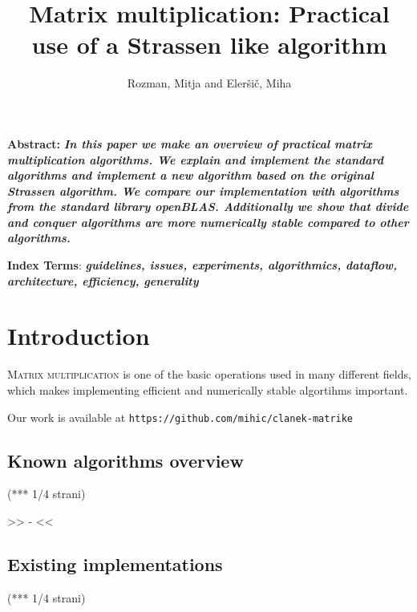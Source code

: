 \documentclass[a4paper,11pt]{article}
\title{Matrix multiplication: Practical use of a Strassen like algorithm}
\author{Rozman, Mitja and Eleršič, Miha}
\date{}
\renewenvironment{abstract}
{\begin{spacing}{1}\small\textbf{Abstract:}\bfseries\itshape}
{\end{spacing}}
\begin{document}
\maketitle



\begingroup
\renewcommand\thefootnote{}
\endgroup

\begin{abstract} %
In this paper we make an overview of practical matrix multiplication algorithms.
We explain and implement the standard algorithms and implement a new algorithm based on the original Strassen algorithm.
We compare our implementation with algorithms from the standard library openBLAS. Additionally we show that divide and conquer algorithms are more numerically stable compared to other algorithms.
\end{abstract}
\vspace{0.5cm}
\begin{spacing}{0.9}
\small\textbf{Index Terms}: \textbf{\textit{guidelines, issues, experiments, algorithmics, dataflow, architecture, efficiency, generality}}
\end{spacing}


\section{Introduction}

\lettrine{M}{atrix multiplication}
is one of the basic operations used in many different fields, which makes implementing efficient and numerically stable algortihms important.

Our work is available at \texttt{https://github.com/mihic/clanek-matrike}


\subsection{Known algorithms overview}
(*** 1/4 strani)

>>
-
<<

\subsection{Existing implementations}
(*** 1/4 strani)
\end{document}
